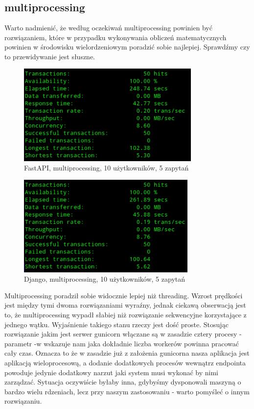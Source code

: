 \subsection{multiprocessing}
Warto nadmienić, że według oczekiwań multiprocessing powinien być rozwiązaniem, które w przypadku wykonywania obliczeń matematycznych powinien w środowisku wielordzeniowym poradzić sobie najlepiej. Sprawdźmy czy to przewidywanie jest słuszne.
\begin{figure}[H]
    \includegraphics[height=50mm]{zdjecia/10_math_process_fast}
    \centering
    \caption{FastAPI, multiprocessing, 10 użytkowników, 5 zapytań}
\end{figure}

\begin{figure}[H]
    \includegraphics[height=50mm]{zdjecia/10_math_process_django}
    \centering
    \caption{Django, multiprocessing, 10 użytkowników, 5 zapytań}
\end{figure}
Multiprocessing poradził sobie widocznie lepiej niż threading. Wzrost prędkości jest między tymi dwoma rozwiązaniami wyraźny, jednak ciekawą obserwacją jest to, że multiprocessing wypadł słabiej niż rozwiązanie sekwencyjne korzystające z jednego wątku. Wyjaśnienie takiego stanu rzeczy jest dość proste. Stosując rozwiązanie jakim jest serwer gunicorn włączane są w zasadzie cztery procesy - parametr -w wskazuje nam jaka dokładnie liczba workerów powinna pracować cały czas. Oznacza to że w zasadzie już z założenia gunicorna nasza aplikacja jest aplikacją wieloprocesową, a dodanie dodatkowych procesów wewnątrz endpointa powoduje jedynie dodatkowy narzut jaki system musi wykonać by nimi zarządzać. Sytuacja oczywiście byłaby inna, gdybyśmy dysponowali maszyną o bardzo wielu rdzeniach, lecz przy naszym zastosowaniu - warto pomyśleć o innym rozwiązaniu.

